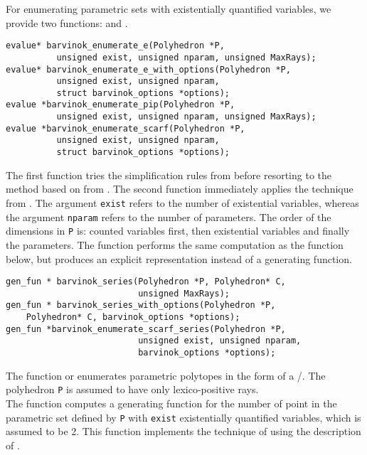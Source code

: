 For enumerating parametric sets with existentially quantified variables,
we provide two functions:
and
.
\begin{verbatim}
evalue* barvinok_enumerate_e(Polyhedron *P,
          unsigned exist, unsigned nparam, unsigned MaxRays);
evalue* barvinok_enumerate_e_with_options(Polyhedron *P, 
          unsigned exist, unsigned nparam,
          struct barvinok_options *options);
evalue *barvinok_enumerate_pip(Polyhedron *P,
          unsigned exist, unsigned nparam, unsigned MaxRays);
evalue *barvinok_enumerate_scarf(Polyhedron *P,
          unsigned exist, unsigned nparam,
          struct barvinok_options *options);
\end{verbatim}
The first function tries the simplification rules from
 before resorting to the method
based on  from .
The second function immediately applies the technique from
.
The argument \verb+exist+ refers to the number of existential variables,
whereas
the argument \verb+nparam+ refers to the number of parameters.
The order of the dimensions in \verb+P+ is:
counted variables first, then existential variables and finally
the parameters.
The function  performs the same
computation as the function 
below, but produces an explicit representation instead of a generating function.

\begin{verbatim}
gen_fun * barvinok_series(Polyhedron *P, Polyhedron* C, 
                          unsigned MaxRays);
gen_fun * barvinok_series_with_options(Polyhedron *P,
    Polyhedron* C, barvinok_options *options);
gen_fun *barvinok_enumerate_scarf_series(Polyhedron *P,
                          unsigned exist, unsigned nparam,
                          barvinok_options *options);
\end{verbatim}
The function 
 or
 enumerates parametric polytopes
in the form of a \rgf/.
The polyhedron \verb+P+ is assumed to have only
lexico-positive rays.
\\
The function  computes a
generating function for the number of point in the parametric set
defined by \verb+P+ with \verb+exist+ existentially quantified
variables, which is assumed to be 2.
This function implements the technique of
 using the 
description of .

